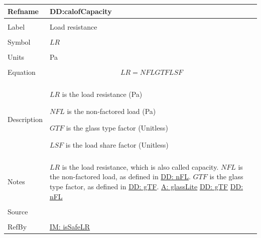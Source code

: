 \documentclass[12pt]{article}
\begin{document}
\noindent \begin{minipage}{\textwidth}
          \begin{tabular}{>{\raggedright}p{}>{\raggedright\arraybackslash}p{}}
          \toprule \textbf{Refname} & \textbf{DD:calofCapacity}
          \label{DD:calofCapacity}
          \\ \midrule \\
          Label & Load resistance
          \\ \midrule \\
          Symbol & $LR$
          \\ \midrule \\
          Units & Pa
          \\ \midrule \\
          Equation & \begin{displaymath}
                     LR=NFL GTF LSF
                     \end{displaymath}
          \\ \midrule \\
          Description & \begin{symbDescription}
                        \item{$LR$ is the load resistance (Pa)}
                        \item{$NFL$ is the non-factored load (Pa)}
                        \item{$GTF$ is the glass type factor (Unitless)}
                        \item{$LSF$ is the load share factor (Unitless)}
                        \end{symbDescription}
          \\ \midrule \\
          Notes & $LR$ is the load resistance, which is also called capacity. $NFL$ is the non-factored load, as defined in \hyperref[DD:nFL]{DD: nFL}. $GTF$ is the glass type factor, as defined in \hyperref[DD:gTF]{DD: gTF}.
                  \hyperref[assumpGL]{A: glassLite}
                  \hyperref[DD:gTF]{DD: gTF}
                  \hyperref[DD:nFL]{DD: nFL}
          \\ \midrule \\
          Source & \cite{astm2009}
          \\ \midrule \\
          RefBy & \hyperref[IM:isSafeLR]{IM: isSafeLR}
          \\ \bottomrule
          \end{tabular}
          \end{minipage}
\par~
\end{document}
